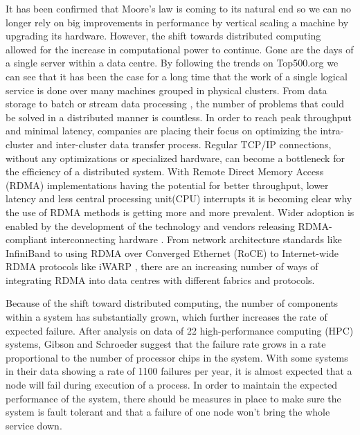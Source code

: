 \documentclass[bsc,frontabs,twoside,singlespacing,parskip,deptreport,hidel]{infthesis}     %
\begin{document}
It has been confirmed that Moore's law is coming to its natural end \cite{MooresLaw_techworld:online,MooresLaw_mit_techreview:online} so we can no longer rely on big improvements in performance by vertical scaling a machine by upgrading its hardware. However, the shift towards distributed computing allowed for the increase in computational power to continue. Gone are the days of a single server within a data centre. By following the trends on Top500.org \cite{top500:online} we can see that it has been the case for a long time that the work of a single logical service is done over many machines grouped in physical clusters. From data storage \cite{corbett2013spanner} to batch or stream data processing \cite{lambdaws:online}, the number of problems that could be solved in a distributed manner is countless. In order to reach peak throughput and minimal latency, companies are placing their focus on optimizing the intra-cluster and inter-cluster data transfer process.  Regular TCP/IP connections, without any optimizations or specialized hardware, can become a bottleneck for the efficiency of a distributed system. With Remote Direct Memory Access (RDMA) implementations having the potential for better throughput, lower latency and less central processing unit(CPU) interrupts \cite{oberg2006evaluation} it is becoming clear why the use of RDMA methods is getting more and more prevalent.  Wider adoption is enabled by the development of the technology and vendors releasing RDMA-compliant interconnecting hardware \cite{cisco2018RoCE}. From network architecture standards like InfiniBand \cite{pfister2001infiniband} to using RDMA over Converged Ethernet (RoCE) \cite{mellanox2016roce} to Internet-wide RDMA protocols like iWARP \cite{intel2015iwarp}, there are an increasing number of ways of integrating RDMA into data centres with different fabrics and protocols.

Because of the shift toward distributed computing, the number of components within a system has substantially grown, which further increases the rate of expected failure. After analysis on data of 22 high-performance computing (HPC) systems, Gibson and Schroeder \cite{schroeder2007understanding} suggest that the failure rate grows in a rate proportional to the number of processor chips in the system. With some systems in their data showing a rate of 1100 failures per year, it is almost expected that a node will fail during execution of a process. In order to maintain the expected performance of the system, there should be measures in place to make sure the system is fault tolerant and that a failure of one node won't bring the whole service down.
\end{document}
